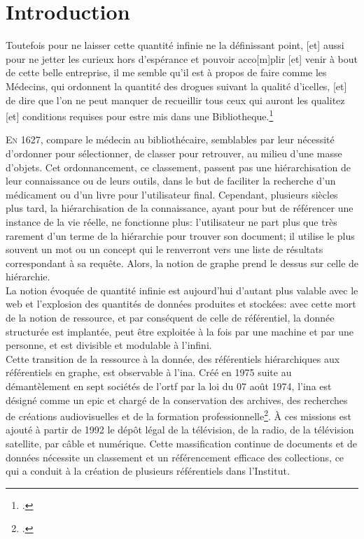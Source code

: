 	\chapter*{\label{introduction_generale}Introduction}

\begin{citationLongue}
	Toutefois pour ne laisser cette quantité infinie ne la définissant point, [et] aussi pour ne jetter les curieux hors d'espérance et pouvoir acco[m]plir [et] venir à bout de cette belle entreprise, il me semble qu'il est à propos de faire comme les Médecins, qui ordonnent la quantité des drogues suivant la qualité d'icelles, [et] de dire que l'on ne peut manquer de recueillir tous ceux qui auront les qualitez [et] conditions requises pour estre mis dans une Bibliotheque.\footcite[p.41-42]{naude_advis_1627}
\end{citationLongue}


\lettrine{E}n 1627,  compare le médecin au bibliothécaire, semblables par leur nécessité d'ordonner pour sélectionner, de classer pour retrouver, au milieu d'une masse d'objets. Cet ordonnancement, ce classement, passent pas une hiérarchisation de leur connaissance ou de leurs outils, dans le but de faciliter la recherche d'un médicament ou d'un livre pour l'utilisateur final. Cependant, plusieurs siècles plus tard, la hiérarchisation de la connaissance, ayant pour but de référencer une instance de la vie réelle, ne fonctionne plus: l'utilisateur ne part plus que très rarement d'un terme de la hiérarchie pour trouver son document; il utilise le plus souvent un mot ou un concept qui le renverront vers une liste de résultats correspondant à sa requête. Alors, la notion de graphe prend le dessus sur celle de hiérarchie.\\

La notion évoquée de \og quantité infinie \fg{} est aujourd'hui d'autant plus valable avec le web et l'explosion des quantités de données produites et stockées: avec cette mort de la notion de ressource, et par conséquent de celle de référentiel, la donnée structurée est implantée, peut être exploitée à la fois par une machine et par une personne, et est divisible et modulable à l'infini.\\

Cette transition de la ressource à la donnée, des référentiels hiérarchiques aux référentiels en graphe, est observable à l'\ac{ina}. Créé en 1975 suite au démantèlement en sept sociétés de l'\ac{ortf} par la loi du 07 août 1974, l'\ac{ina} est désigné comme un \ac{epic} et \og chargé de la conservation des archives, des recherches de créations audiovisuelles et de la formation professionnelle\fg{}\footcite[art.3]{noauthor_loi_1974}. À ces missions est ajouté à partir de 1992 le dépôt légal de la télévision, de la radio, de la télévision satellite, par câble et numérique. Cette massification continue de documents et de données nécessite un classement et un référencement efficace des collections, ce qui a conduit à la création de plusieurs référentiels dans l'Institut.\\

